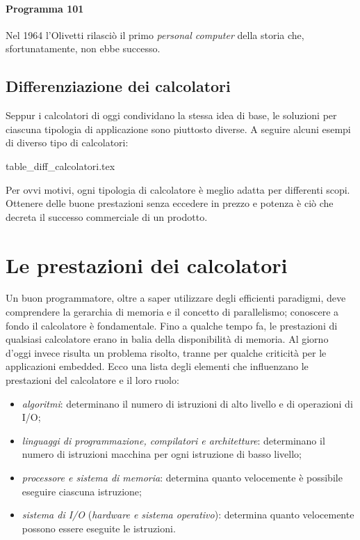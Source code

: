 \paragraph{Programma 101}
Nel 1964 l'Olivetti rilasciò il primo \emph{personal computer} della storia che, sfortunatamente, non ebbe successo.

\subsection{Differenziazione dei calcolatori}

Seppur i calcolatori di oggi condividano la stessa idea di base, le soluzioni per ciascuna tipologia di applicazione sono piuttosto diverse.
A seguire alcuni esempi di diverso tipo di calcolatori:

\begin{table}[H]
	\centering
	{table_diff_calcolatori.tex}
\end{table}

Per ovvi motivi, ogni tipologia di calcolatore è meglio adatta per differenti scopi.
Ottenere delle buone prestazioni senza eccedere in prezzo e potenza è ciò che decreta il successo commerciale di un prodotto.

\section{Le prestazioni dei calcolatori}
Un buon programmatore, oltre a saper utilizzare degli efficienti paradigmi, deve comprendere la gerarchia di memoria e il concetto di parallelismo; conoscere a fondo il calcolatore è fondamentale.
Fino a qualche tempo fa, le prestazioni di qualsiasi calcolatore erano in balia della disponibilità di memoria.
Al giorno d'oggi invece risulta un problema risolto, tranne per qualche criticità per le applicazioni embedded.
Ecco una lista degli elementi che influenzano le prestazioni del calcolatore e il loro ruolo:
\begin{itemize}
	\item \emph{algoritmi}: determinano il numero di istruzioni di alto livello e di operazioni di I/O;
	\item \emph{linguaggi di programmazione, compilatori e architetture}: determinano il numero di istruzioni macchina per ogni istruzione di basso livello;
	\item \emph{processore e sistema di memoria}: determina quanto velocemente è possibile eseguire ciascuna istruzione;
	\item \emph{sistema di I/O} (\emph{hardware e sistema operativo}): determina quanto velocemente possono essere eseguite le istruzioni.
\end{itemize}

